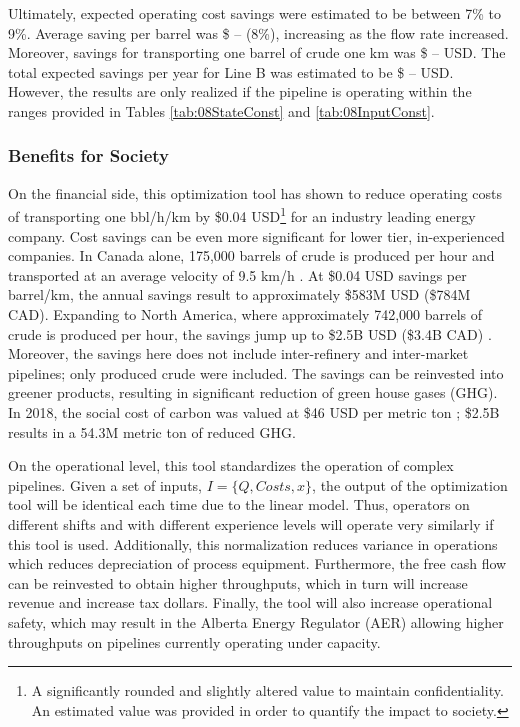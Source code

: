 Ultimately, expected operating cost savings were estimated to be between 7\% to 9\%.  Average saving per barrel was \$ -- (8\%), increasing as the flow rate increased. Moreover, savings for transporting one barrel of crude one km was \$ -- USD.  The total expected savings per year for Line B was estimated to be \$ -- USD.  However, the results are only realized if the pipeline is operating within the ranges provided in Tables \ref{tab:08StateConst} and \ref{tab:08InputConst}.

\subsubsection{Benefits for Society}
On the financial side, this optimization tool has shown to reduce operating costs of transporting one bbl/h/km by \$0.04 USD\footnote{A significantly rounded and slightly altered value to maintain confidentiality.  An estimated value was provided in order to quantify the impact to society.} for an industry leading energy company. Cost savings can be even more significant for lower tier, in-experienced companies. In Canada alone, 175,000 barrels of crude is produced per hour and transported at an average velocity of 9.5 km/h \cite{canada_crude_facts}. At \$0.04 USD savings per barrel/km, the annual savings result to approximately \$583M USD (\$784M CAD).  Expanding to North America, where approximately 742,000 barrels of crude is produced per hour, the savings jump up to \$2.5B USD (\$3.4B CAD) \cite{NA_crude_facts}. Moreover, the savings here does not include inter-refinery and inter-market pipelines; only produced crude were included.  The savings can be reinvested into greener products, resulting in significant reduction of green house gases (GHG). In 2018, the social cost of carbon was valued at \$46 USD per metric ton \cite{cost_of_carbon}; \$2.5B results in a 54.3M metric ton of reduced GHG.

On the operational level, this tool standardizes the operation of complex pipelines. Given a set of inputs, $I = \{Q, Costs, x\}$, the output of the optimization tool will be identical each time due to the linear model. Thus, operators on different shifts and with different experience levels will operate very similarly if this tool is used.  Additionally, this normalization reduces variance in operations which reduces depreciation of process equipment. Furthermore, the free cash flow can be reinvested to obtain higher throughputs, which in turn will increase revenue and increase tax dollars.  Finally, the tool will also increase operational safety, which may result in the Alberta Energy Regulator (AER) allowing higher throughputs on pipelines currently operating under capacity.

